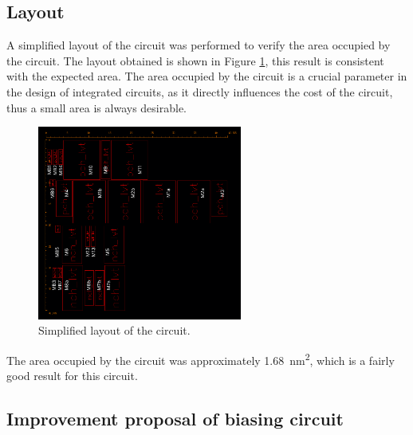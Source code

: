 \subsection{Layout}

A simplified layout of the circuit was performed to verify the area occupied by the circuit. The layout obtained is shown in Figure \ref{fig:layout}, this result is consistent with the expected area. The area occupied by the circuit is a crucial parameter in the design of integrated circuits, as it directly influences the cost of the circuit, thus a small area is always desirable.

\begin{figure}[H]
    \centering
    \includegraphics[width=0.6\textwidth]{Images/layout.png}
    \caption{Simplified layout of the circuit.}
    \label{fig:layout}
\end{figure}

The area occupied by the circuit was approximately \SI{1.68}{\nano\meter\squared}, which is a fairly good result for this circuit.

\subsection{Improvement proposal of biasing circuit}

